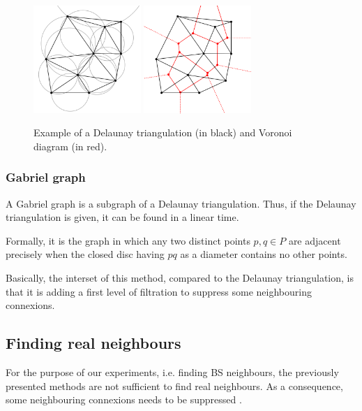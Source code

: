 \documentclass[lettersize,journal,english]{IEEEtran}
\begin{document}
            \begin{figure}
                \centering
                \includegraphics[width=1.6in]{images/illus_graphs/Delaunay_circumcircles_vectorial.png}
                \includegraphics[width=1.6in]{images/illus_graphs/Delaunay_Voronoi.png}
                \caption{Example of a Delaunay triangulation (in black) and Voronoi diagram (in red).}
                \label{fig:del_tri}
            \end{figure}

        \subsubsection{Gabriel graph}
            A Gabriel graph \cite{10.2307/2412323} is a subgraph of a Delaunay triangulation. Thus, if the Delaunay triangulation is given, it can be found in a linear time. 

            Formally, it is the graph in which any two distinct points $p, q \in P$ are adjacent precisely when the closed disc having $pq$ as a diameter contains no other points.

            Basically, the interset of this method, compared to the Delaunay triangulation, is that it is adding a first level of filtration to suppress some neighbouring connexions.

    \subsection{Finding real neighbours}
        For the purpose of our experiments, i.e. finding BS neighbours, the previously presented methods are not sufficient to find real neighbours.
        As a consequence, some neighbouring connexions needs to be suppressed \cite{patent_neighs}.
\end{document}
